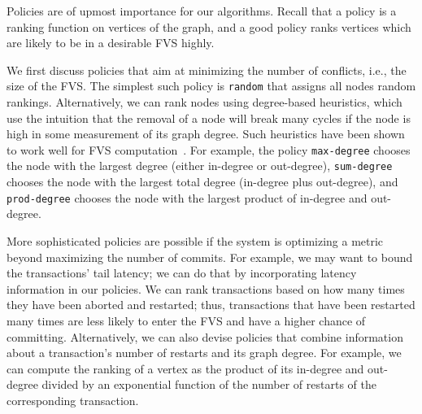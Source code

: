 Policies are of upmost importance for our algorithms. Recall that a policy is a ranking function on vertices of the graph, and a good policy ranks vertices which are likely to be in a desirable FVS highly. 

We first discuss policies that aim at minimizing the number of conflicts, i.e., the size of the FVS. The simplest such policy is \texttt{random} that assigns all nodes random rankings. Alternatively, we can rank nodes using degree-based heuristics, which use the intuition that the removal of a node will break many cycles if the node is high in some measurement of its graph degree. Such heuristics have  been shown to work well for FVS computation~\cite{cutello2015targeting}. For example, the policy \texttt{max-degree} chooses the node with the largest degree (either in-degree or out-degree), \texttt{sum-degree} chooses the node with the largest total degree (in-degree plus out-degree), and \texttt{prod-degree} chooses the node with the largest product of in-degree and out-degree. 

More sophisticated policies are possible if the system is optimizing a metric beyond maximizing the number of commits. For example, we may want to bound the transactions' tail latency; we can do that by incorporating latency information in our policies. We can rank transactions based on how many times they have been aborted and restarted; thus, transactions that have been restarted many times are less likely to enter the FVS and have a higher chance of committing.  Alternatively, we can also devise policies that combine information about a transaction's number of restarts and its graph degree. For example, we can compute the ranking of a vertex as the product of its in-degree and out-degree divided by an exponential function of the number of restarts of the corresponding transaction. 


